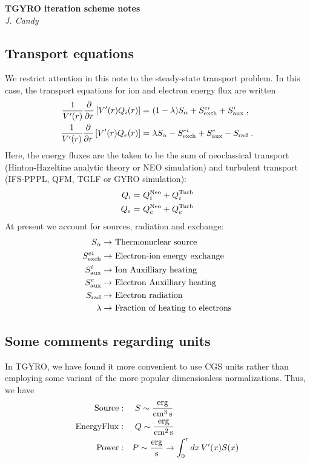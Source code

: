 \documentclass[dvips,12pt]{revtex4}
\newcommand\vpr{V^\prime}
\begin{document}
\begin{center}
{\bf TGYRO iteration scheme notes}\\
{\sl J. Candy}
\end{center}

\subsection{Transport equations}

We restrict attention in this note to the steady-state transport 
problem.  In this case, the transport equations for ion and 
electron energy flux are written
%
\begin{align}
\frac{1}{\vpr(r)} \frac{\partial}{\partial r} \left[ 
\vpr(r) Q_i(r) \right] = &~(1-\lambda) S_\alpha + S_{\rm exch}^{ei} 
  + S_{\rm aux}^i \; , \\ 
\frac{1}{\vpr(r)} \frac{\partial}{\partial r} \left[ 
\vpr(r) Q_e(r) \right] = &~\lambda S_\alpha - S_{\rm exch}^{ei} 
 + S_{\rm aux}^e - S_{\rm rad} \; . 
\end{align}
%
Here, the energy fluxes are the taken to be the sum of neoclassical 
transport (Hinton-Hazeltine analytic theory or NEO simulation) and 
turbulent transport (IFS-PPPL, QFM, TGLF or GYRO simulation):
%
\begin{align}
Q_i = & ~Q_i^{\rm Neo} + Q_i^{\rm Turb} \\ 
Q_e = & ~Q_e^{\rm Neo} + Q_e^{\rm Turb} 
\end{align}
%
At present we account for sources, radiation and exchange:
%
\begin{align*}
S_\alpha \rightarrow &~\text{Thermonuclear source} \\
S_{\rm exch}^{ei} \rightarrow &~\text{Electron-ion energy exchange} \\
S_{\rm aux}^i \rightarrow &~\text{Ion Auxilliary heating} \\
S_{\rm aux}^e \rightarrow &~\text{Electron Auxilliary heating} \\
S_{\rm rad} \rightarrow &~\text{Electron radiation} \\
\lambda \rightarrow &~\text{Fraction of heating to electrons}
\end{align*}
% 
\subsection{Some comments regarding units}

In TGYRO, we have found it more convenient to use CGS units
rather than employing some variant of the more popular 
dimensionless normalizations.  Thus, we have
%
\begin{align}
{\rm Source}: \quad &~ S \sim \frac{{\rm erg}}{{\rm cm}^3 \, {\rm s}} \\
{\rm Energy Flux}: \quad &~ Q \sim \frac{{\rm erg}}{{\rm cm}^2 \, {\rm s}} \\
{\rm Power}: \quad & P \sim  \frac{{\rm erg}}{{\rm s}} \rightarrow 
  \int_0^r dx \, V^\prime(x) S(x) 
\end{align}
\end{document}

